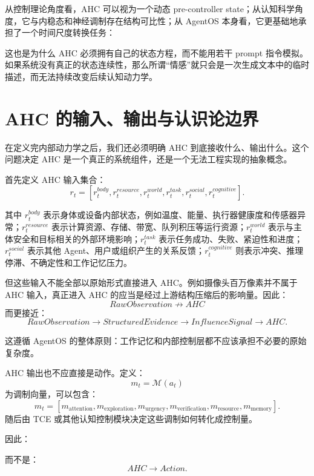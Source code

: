 从控制理论角度看，AHC 可以视为一个动态 pre-controller state；从认知科学角度，它与内稳态和神经调制存在结构可比性；从 AgentOS 本身看，它更基础地承担了一个时间尺度转换任务：
\begin{statementbox}
\centering
{}
\end{statementbox}

这也是为什么 AHC 必须拥有自己的状态方程，而不能用若干 prompt 指令模拟。如果系统没有真正的状态连续性，那么所谓“情感”就只会是一次生成文本中的临时描述，而无法持续改变后续认知动力学。

\section{AHC 的输入、输出与认识论边界}

在定义完内部动力学之后，我们还必须明确 AHC 到底接收什么、输出什么。这个问题决定 AHC 是一个真正的系统组件，还是一个无法工程实现的抽象概念。

首先定义 AHC 输入集合：
\[
r_t
=
[
r_t^{body},
r_t^{resource},
r_t^{world},
r_t^{task},
r_t^{social},
r_t^{cognitive}
].
\]

其中 \(r_t^{body}\) 表示身体或设备内部状态，例如温度、能量、执行器健康度和传感器异常；\(r_t^{resource}\) 表示计算资源、存储、带宽、队列积压等运行资源；\(r_t^{world}\) 表示与主体安全和目标相关的外部环境影响；\(r_t^{task}\) 表示任务成功、失败、紧迫性和进度；\(r_t^{social}\) 表示其他 Agent、用户或组织产生的关系反馈；\(r_t^{cognitive}\) 则表示冲突、推理停滞、不确定性和工作记忆压力。

但这些输入不能全部以原始形式直接进入 AHC。例如摄像头百万像素并不属于 AHC 输入，真正进入 AHC 的应当是经过上游结构压缩后的影响量。因此：
\[
RawObservation
\not\rightarrow
AHC
\]
而更接近：
\[
RawObservation
\rightarrow
StructuredEvidence
\rightarrow
InfluenceSignal
\rightarrow
AHC.
\]

这遵循 AgentOS 的整体原则：工作记忆和内部控制层都不应该承担不必要的原始复杂度。

AHC 输出也不应直接是动作。定义：
\[
m_t
=
\mathcal M(a_t)
\]
为调制向量，可以包含：
\[
m_t=
[
m_{\mathrm{attention}},
m_{\mathrm{exploration}},
m_{\mathrm{urgency}},
m_{\mathrm{verification}},
m_{\mathrm{resource}},
m_{\mathrm{memory}}
].
\]
随后由 TCE 或其他认知控制模块决定这些调制如何转化成控制量。

因此：
\begin{statementbox}
\centering
{}
\end{statementbox}
而不是：
\[
AHC
\rightarrow
Action.
\]

